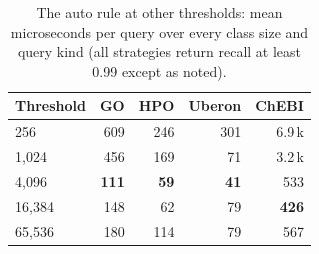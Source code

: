 \begin{table}[t]
\caption{The auto rule at other thresholds: mean microseconds per query over every class size and query kind (all strategies return recall at least 0.99 except as noted).}
\label{tab-threshold}
\small
\begin{tabular}{@{}lrrrr@{}}
\toprule
Threshold & GO & HPO & Uberon & ChEBI \\
\midrule
256 & 609 & 246 & 301 & 6.9\,k \\
1,024 & 456 & 169 & 71 & 3.2\,k \\
4,096 & \cellcolor{ours}\textbf{111} & \cellcolor{ours}\textbf{59} & \cellcolor{ours}\textbf{41} & 533 \\
16,384 & 148 & 62 & 79 & \cellcolor{ours}\textbf{426} \\
65,536 & 180 & 114 & 79 & 567 \\
\bottomrule
\end{tabular}
\end{table}
